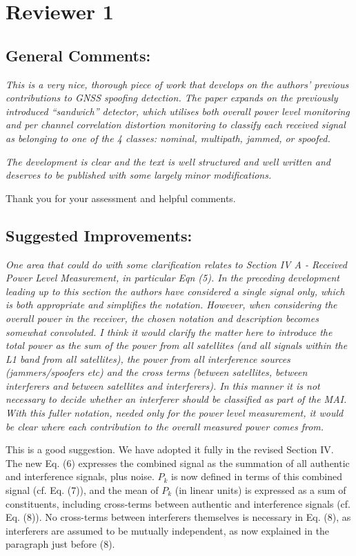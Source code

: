 \documentclass[12pt]{report}
\begin{document}
\section*{Reviewer 1}
\subsection*{General Comments:}

{\textit{This is a very nice, thorough piece of work that develops on the
    authors' previous contributions to GNSS spoofing detection. The paper
    expands on the previously introduced ``sandwich'' detector, which utilises
    both overall power level monitoring and per channel correlation distortion
    monitoring to classify each received signal as belonging to one of the 4
    classes: nominal, multipath, jammed, or spoofed.}}

{\textit{The development is clear and the text is well structured and well
    written and deserves to be published with some largely minor
    modifications.}}
  
{Thank you for your assessment and helpful comments.}
  
  
\subsection*{Suggested Improvements:}

{\textit{One area that could do with some clarification relates to
      Section IV A -
Received Power Level Measurement, in particular Eqn
      (5). In the preceding
development leading up to this section the
      authors have considered a single
signal only, which is both appropriate
      and simplifies the notation. However,
when considering the overall
      power in the receiver, the chosen notation and
description becomes
      somewhat convoluted. I think it would clarify the matter
here to
      introduce the total power as the sum of the power from all
      satellites
(and all signals within the L1 band from all satellites),
      the power from all
interference sources (jammers/spoofers etc) and the
      cross terms (between
satellites, between interferers and between
      satellites and interferers). In
this manner it is not necessary to
      decide whether an interferer should be
classified as part of the
      MAI. With this fuller notation, needed only for the
power level
      measurement, it would be clear where each contribution to the
overall
      measured power comes from.}}

  
  { This is a good suggestion.  We have adopted it fully in the revised
    Section IV.  The new Eq. (6) expresses the combined signal as the
    summation of all authentic and interference signals, plus noise.  $P_k$ is
    now defined in terms of this combined signal (cf. Eq. (7)), and the
    mean of $P_k$ (in linear units) is expressed as a sum of constituents,
    including cross-terms between authentic and interference signals
    (cf. Eq. (8)).  No cross-terms between interferers themselves is
    necessary in Eq. (8), as interferers are assumed to be mutually
    independent, as now explained in the paragraph just before (8).}
  
\end{document}
